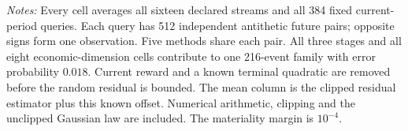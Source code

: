 \begin{minipage}{0.97\linewidth}\footnotesize\emph{Notes:} Every cell averages all sixteen declared streams and all 384 fixed current-period queries. Each query has 512 independent antithetic future pairs; opposite signs form one observation. Five methods share each pair. All three stages and all eight economic-dimension cells contribute to one 216-event family with error probability $0.018$. Current reward and a known terminal quadratic are removed before the random residual is bounded. The mean column is the clipped residual estimator plus this known offset. Numerical arithmetic, clipping and the unclipped Gaussian law are included. The materiality margin is $10^{-4}$.
\end{minipage}
